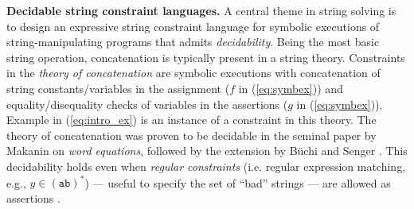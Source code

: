 \smallskip
\noindent
\textbf{Decidable string constraint languages.}
A central theme in string solving is to design an
expressive string constraint language for symbolic executions of 
string-manipulating
programs that admits \emph{decidability}. 
Being the most basic string operation,
concatenation is typically present in a string theory.
Constraints in the \emph{theory of concatenation} 
are symbolic executions %
with concatenation of string constants/variables in the
assignment ($f$ in (\ref{eq:symbex})) and equality/disequality checks of
variables in the assertions ($g$ in (\ref{eq:symbex})).
Example in (\ref{eq:intro_ex}) is an instance of a constraint in this theory.
The theory of concatenation was 
proven to be decidable in the seminal
paper by Makanin \cite{Makanin} on \emph{word equations}, followed by the
extension by B\"{u}chi and Senger \cite{buchi}.
This decidability holds even when
\emph{regular constraints} (i.e. regular expression matching, e.g., 
$y \in (\texttt{ab})^*$) --- useful to specify the set of ``bad'' strings ---
are allowed as assertions \cite{Schulz}. 

